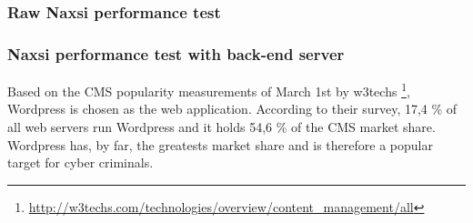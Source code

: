\documentclass[Methods]{subfiles}
\begin{document}
\subsubsection{Raw Naxsi performance test}

\subsubsection{Naxsi performance test with back-end server}
Based on the \ac{CMS} popularity measurements of March 1st by w3techs \footnote{\url{http://w3techs.com/technologies/overview/content_management/all}}, Wordpress is chosen as the web application. According to their survey, 17,4 \% of all web servers run Wordpress and it holds 54,6 \% of the CMS market share. Wordpress has, by far, the greatests market share and is therefore a popular target for cyber criminals.
\end{document}
